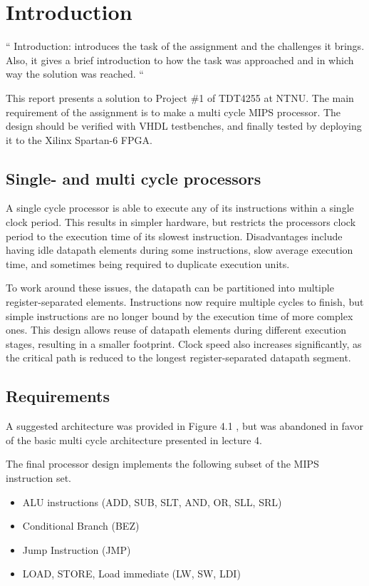 \section{Introduction}
\label{sec:intro}

``
Introduction: introduces the task of the assignment and the challenges it brings.
Also, it gives a brief introduction to how the task was approached and in which way the solution was reached.
``

This report presents a solution to Project \#1 of TDT4255 at NTNU.
The main requirement of the assignment is to make a multi cycle MIPS processor\cite[p.47]{compendium}. The design should be verified with VHDL testbenches, and finally tested by deploying it to the Xilinx Spartan-6 FPGA.

\subsection{Single- and multi cycle processors}

A single cycle processor is able to execute any of its instructions within a single clock period.
This results in simpler hardware, but restricts the processors clock period to the execution time of its slowest instruction.
Disadvantages include having idle datapath elements during some instructions, slow average execution time, and sometimes being required to duplicate execution units.

To work around these issues, the datapath can be partitioned into multiple register-separated elements.
Instructions now require multiple cycles to finish, but simple instructions are no longer bound by the execution time of more complex ones.
This design allows reuse of datapath elements during different execution stages, resulting in a smaller footprint.
Clock speed also increases significantly, as the critical path is reduced to the longest register-separated datapath segment.

\subsection{Requirements}
\label{subsec:req}
A suggested architecture was provided in Figure 4.1 \cite[p.45]{compendium}, but was abandoned in favor of the basic multi cycle architecture presented in lecture 4.\cite{lecture-4}

The final processor design implements the following subset of the MIPS instruction set.

\begin{itemize}
    \item ALU instructions (ADD, SUB, SLT, AND, OR, SLL, SRL)
    \item Conditional Branch (BEZ)
    \item Jump Instruction (JMP)
    \item LOAD, STORE, Load immediate (LW, SW, LDI)
\end{itemize}

